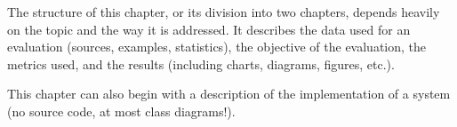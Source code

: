 The structure of this chapter, or its division into two chapters, depends heavily on the topic and the way it is addressed. It describes the data used for an evaluation (sources, examples, statistics), the objective of the evaluation, the metrics used, and the results (including charts, diagrams, figures, etc.).

This chapter can also begin with a description of the implementation of a system (no source code, at most class diagrams!).